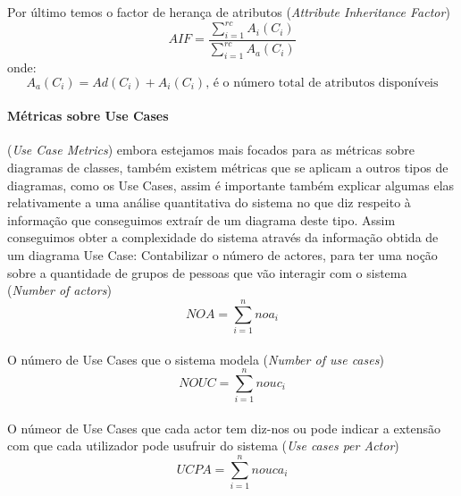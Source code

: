 Por último temos o factor de herança de atributos (\textit{Attribute Inheritance Factor}) $$AIF = \frac{\sum_{i=1}^{rc} A_i(C_i)}{\sum_{i=1}^{rc} A_a(C_i)} $$
onde:
$$ A_a(C_i) = Ad(C_i) + A_i(C_i)\textrm{, é o número total de atributos disponíveis}$$
\paragraph{Métricas sobre Use Cases} (\textit{Use Case Metrics}) embora estejamos mais focados para as métricas sobre diagramas de classes,
também existem métricas que se aplicam a outros tipos de diagramas, como os Use Cases, assim é importante também explicar algumas elas
relativamente a uma análise quantitativa do sistema no que diz respeito à informação que conseguimos extraír de um diagrama deste tipo.
Assim conseguimos obter a complexidade do sistema através da informação obtida de um diagrama Use Case:
Contabilizar o número de actores, para ter uma noção sobre a quantidade de grupos de pessoas que
vão interagir com o sistema (\textit{Number of actors})  $$NOA = \sum_{i=1}^{n} noa_i $$
\\
O número de Use Cases que o sistema modela (\textit{Number of use cases})  $$NOUC = \sum_{i=1}^{n} nouc_i $$
\\
O númeor de Use Cases que cada actor tem diz-nos ou pode indicar a extensão com que cada utilizador pode
usufruir do sistema (\textit{Use cases per Actor}) $$UCPA = \sum_{i=1}^{n} nouca_i $$
